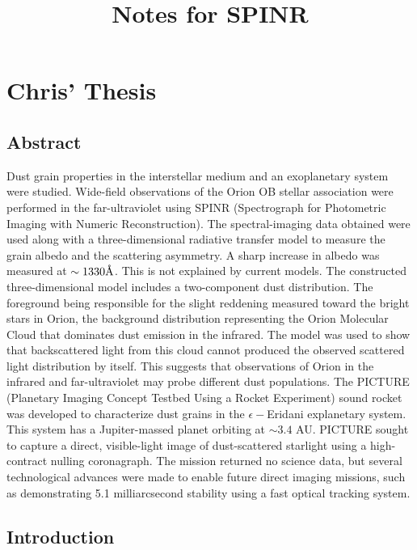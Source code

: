 \documentclass[oneside]{book}
\title{Notes for SPINR}
\theoremstyle{definition}
\numberwithin{equation}{section}
\begin{document}
\setcounter{section}{-1}
\date{\vspace{-5ex}}
\maketitle
\tableofcontents

\chapter{Chris' Thesis}

\section{Abstract}

Dust grain properties in the interstellar medium and an exoplanetary system were studied. Wide-field observations of the Orion OB stellar association were performed in the far-ultraviolet using SPINR (Spectrograph for Photometric Imaging with Numeric Reconstruction). The spectral-imaging data obtained were used along with a three-dimensional radiative transfer model to measure the grain albedo and the scattering asymmetry. A sharp increase in albedo was measured at $\sim 1330\textrm{\r{A}}$. This is not explained by current models. The constructed three-dimensional model includes a two-component dust distribution. The foreground being responsible for the slight reddening measured toward the bright stars in Orion, the background distribution representing the Orion Molecular Cloud that dominates dust emission in the infrared. The model was used to show that backscattered light from this cloud cannot produced the observed scattered light distribution by itself. This suggests that observations of Orion in the infrared and far-ultraviolet may probe different dust populations. The PICTURE (Planetary Imaging Concept Testbed Using a Rocket Experiment) sound rocket was developed to characterize dust grains in the $\epsilon-$Eridani explanetary system. This system has a Jupiter-massed planet orbiting at $\sim3.4$ AU. PICTURE sought to capture a direct, visible-light image of dust-scattered starlight using a high-contract nulling coronagraph. The mission returned no science data, but several technological advances were made to enable future direct imaging missions, such as demonstrating 5.1 milliarcsecond stability using a fast optical tracking system. 

\section{Introduction}
\end{document}
